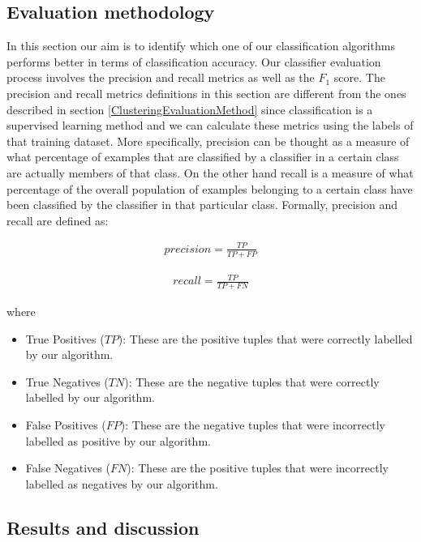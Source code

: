 \subsection{Evaluation methodology}\label{ClassifiersEvaluationMethod}
In this section our aim is to identify which one of our classification algorithms performs better in terms of classification accuracy. Our classifier evaluation process involves the precision and recall metrics as well as the $F_1$ score. The precision and recall metrics definitions in this section are different from the ones described in section \ref{ClusteringEvaluationMethod} since classification is a supervised learning method and we can calculate these metrics using the labels of that training dataset. More specifically, precision can be thought as a measure of what percentage of examples that are classified by a classifier in a certain class are actually members of that class. On the other hand recall is a measure of what percentage of the overall population of examples belonging to a certain class have been classified by the classifier in that particular class. Formally, precision and recall are defined as:

\begin{eqnarray}
precision = \frac{TP}{TP + FP}
\end{eqnarray}  

\begin{eqnarray}
recall = \frac{TP}{TP + FN}
\end{eqnarray}  

where 

\begin{itemize}
  \item True Positives ($TP$): These are the positive tuples that were correctly labelled by our algorithm. 
  \item True Negatives ($TN$): These are the negative tuples that were correctly labelled by our algorithm.
  \item False Positives ($FP$): These are the negative tuples that were incorrectly labelled as positive by our algorithm.
  \item False Negatives ($FN$): These are the positive tuples that were incorrectly labelled as negatives by our algorithm.
\end{itemize}\vspace{15pt}

\subsection{Results and discussion}


